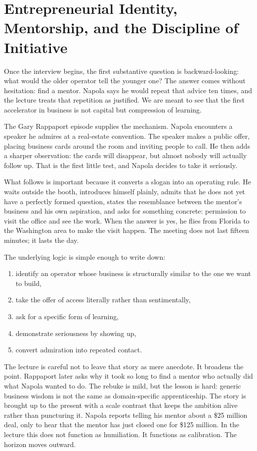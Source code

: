 \section{Entrepreneurial Identity, Mentorship, and the Discipline of Initiative}

Once the interview begins, the first substantive question is backward-looking: what would the older operator tell the younger one? The answer comes without hesitation: find a mentor. Napola says he would repeat that advice ten times, and the lecture treats that repetition as justified. We are meant to see that the first accelerator in business is not capital but compression of learning.

The Gary Rappaport episode supplies the mechanism. Napola encounters a speaker he admires at a real-estate convention. The speaker makes a public offer, placing business cards around the room and inviting people to call. He then adds a sharper observation: the cards will disappear, but almost nobody will actually follow up. That is the first little test, and Napola decides to take it seriously.

What follows is important because it converts a slogan into an operating rule. He waits outside the booth, introduces himself plainly, admits that he does not yet have a perfectly formed question, states the resemblance between the mentor's business and his own aspiration, and asks for something concrete: permission to visit the office and see the work. When the answer is yes, he flies from Florida to the Washington area to make the visit happen. The meeting does not last fifteen minutes; it lasts the day.

The underlying logic is simple enough to write down:
\begin{enumerate}
\item identify an operator whose business is structurally similar to the one we want to build,
\item take the offer of access literally rather than sentimentally,
\item ask for a specific form of learning,
\item demonstrate seriousness by showing up,
\item convert admiration into repeated contact.
\end{enumerate}

The lecture is careful not to leave that story as mere anecdote. It broadens the point. Rappaport later asks why it took so long to find a mentor who actually did what Napola wanted to do. The rebuke is mild, but the lesson is hard: generic business wisdom is not the same as domain-specific apprenticeship. The story is brought up to the present with a scale contrast that keeps the ambition alive rather than puncturing it. Napola reports telling his mentor about a \$25 million deal, only to hear that the mentor has just closed one for \$125 million. In the lecture this does not function as humiliation. It functions as calibration. The horizon moves outward.

